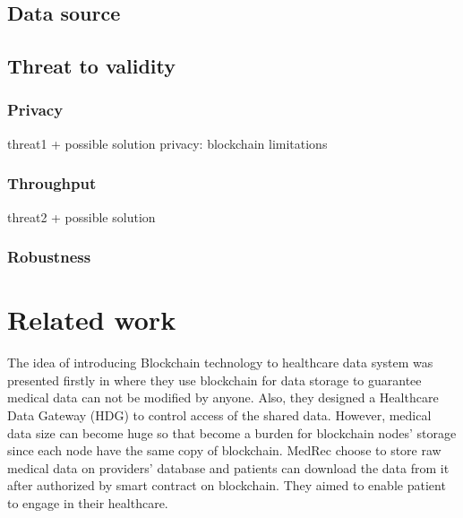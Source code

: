 \documentclass[conference]{IEEEtran}
\begin{document}
\subsection{Data source}


\subsection{Threat to validity}
\subsubsection{Privacy}
threat1 + possible solution
privacy: blockchain limitations 

\subsubsection{Throughput}
threat2 + possible solution

\subsubsection{Robustness}

\section{Related work}
The idea of introducing Blockchain technology to healthcare data system was presented firstly in \cite{yue2016healthcare} where they use blockchain for data storage to guarantee medical data can not be modified by anyone. Also, they designed a Healthcare Data Gateway (HDG) to control access of the shared data. However, medical data size can become huge so that become a burden for blockchain nodes' storage since each node have the same copy of blockchain. MedRec \cite{azaria2016medrec} choose to store raw medical data on providers' database and patients can download the data from it after authorized by smart contract on blockchain. They aimed to enable patient to engage in their healthcare.
\end{document}
